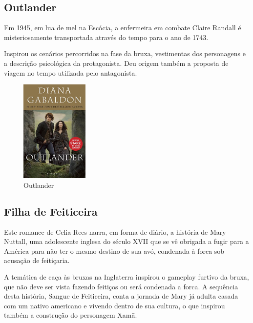 \subsection{Outlander}

Em 1945, em lua de mel na Escócia, a enfermeira em combate Claire Randall é misteriosamente transportada através do tempo para o ano de 1743.

Inspirou os cenários percorridos na fase da bruxa, vestimentas dos personagens e a descrição psicológica da protagonista. Deu origem também a proposta de viagem no tempo utilizada pelo antagonista.

\begin{figure}[!htb] \caption{\label{Outlander}Outlander} \begin{center}
\includegraphics[width=0.3\textwidth]{imagens/outlander.jpg} \end{center}
 \end{figure}

\clearpage

\subsection{Filha de Feiticeira}

Este romance de Celia Rees narra, em forma de diário, a história de Mary Nuttall, uma adolescente inglesa do século XVII que se vê obrigada a fugir para a América para não ter o mesmo destino de sua avó, condenada à forca sob acusação de feitiçaria.

A temática de caça às bruxas na Inglaterra inspirou o gameplay furtivo da bruxa, que não deve ser vista fazendo feitiços ou será condenada a forca.
A sequência desta história, Sangue de Feiticeira, conta a jornada de Mary já adulta casada com um nativo americano e vivendo dentro de sua cultura, o que inspirou também a construção do personagem Xamã.

